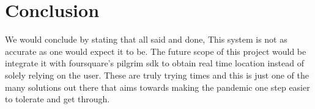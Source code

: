 \documentclass[11pt]{report}
\begin{document}
\chapter{Conclusion}
\par We would conclude by stating that all said and done, This system is not as accurate as one would expect it to be. The future scope of this project would be integrate it with foursquare's pilgrim sdk to obtain real time location instead of solely relying on the user. These are truly trying times and this is just one of the many solutions out there that aims towards making the pandemic one step easier to tolerate and get through. 

\printbibliography
\end{document}

